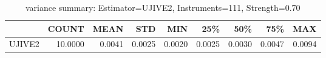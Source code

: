 \begin{table}[ht]
\centering
\caption{variance summary: Estimator=UJIVE2, Instruments=111, Strength=0.70}
\begin{tabular}{lrrrrrrrr}
\toprule
 & COUNT & MEAN & STD & MIN & 25\% & 50\% & 75\% & MAX \\
\midrule
UJIVE2 & 10.0000 & 0.0041 & 0.0025 & 0.0020 & 0.0025 & 0.0030 & 0.0047 & 0.0094 \\
\bottomrule
\end{tabular}
\end{table}
